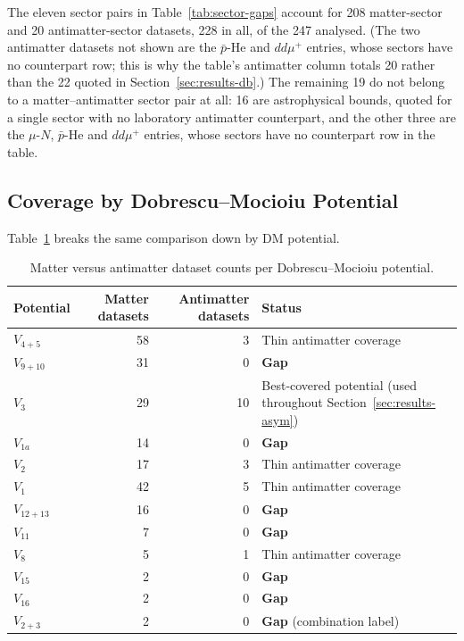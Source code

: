 The eleven sector pairs in Table~\ref{tab:sector-gaps} account for 208
matter-sector and 20 antimatter-sector datasets, 228 in all, of the 247
analysed. (The two antimatter datasets not shown are the $\bar p$-He and
$dd\mu^+$ entries, whose sectors have no counterpart row; this is why the
table's antimatter column totals 20 rather than the 22 quoted in
Section~\ref{sec:results-db}.) The remaining 19 do not belong to a matter--antimatter
sector pair at all: 16 are astrophysical bounds, quoted for a single sector
with no laboratory antimatter counterpart, and the other three are the
$\mu$-$N$, $\bar p$-He and $dd\mu^+$ entries, whose sectors have no
counterpart row in the table.

\subsection{Coverage by Dobrescu--Mocioiu Potential}

Table~\ref{tab:potential-gaps} breaks the same comparison down by DM
potential.

\begin{table}[h]
\centering
\begin{tabular}{@{}l r r >{\raggedright\arraybackslash}p{4.5cm}@{}}
\toprule
Potential & Matter datasets & Antimatter datasets & Status \\
\midrule
$V_{4+5}$  & 58 & 3 & Thin antimatter coverage \\
$V_{9+10}$ & 31 & 0 & \textbf{Gap} \\
$V_3$      & 29 & 10 & Best-covered potential (used throughout Section~\ref{sec:results-asym}) \\
$V_{1a}$   & 14 & 0 & \textbf{Gap} \\
$V_2$      & 17 & 3 & Thin antimatter coverage \\
$V_1$      & 42 & 5 & Thin antimatter coverage \\
$V_{12+13}$& 16 & 0 & \textbf{Gap} \\
$V_{11}$   & 7  & 0 & \textbf{Gap} \\
$V_8$      & 5  & 1 & Thin antimatter coverage \\
$V_{15}$   & 2  & 0 & \textbf{Gap} \\
$V_{16}$   & 2  & 0 & \textbf{Gap} \\
$V_{2+3}$  & 2  & 0 & \textbf{Gap} (combination label) \\
\bottomrule
\end{tabular}
\caption{Matter versus antimatter dataset counts per Dobrescu--Mocioiu potential.}
\label{tab:potential-gaps}
\end{table}

